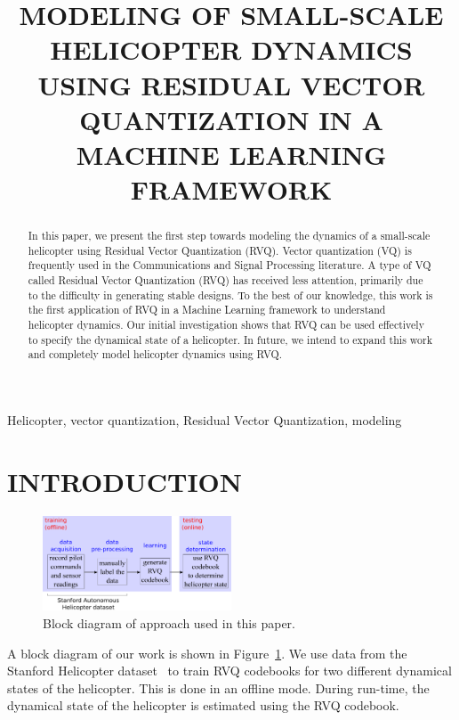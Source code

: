 \documentclass{article}
\title{MODELING OF SMALL-SCALE HELICOPTER DYNAMICS USING RESIDUAL VECTOR QUANTIZATION IN A MACHINE LEARNING FRAMEWORK}
\begin{document}
\ninept
\maketitle
\begin{abstract}
In this paper, we present the first step towards modeling the dynamics of a small-scale helicopter using Residual Vector Quantization (RVQ).  Vector quantization (VQ) is frequently used in the Communications and Signal Processing literature.  A type of VQ called Residual Vector Quantization (RVQ) has received less attention, primarily due to the difficulty in generating stable designs.  To the best of our knowledge, this work is the first application of RVQ in a Machine Learning framework to understand helicopter dynamics.  Our initial investigation shows that RVQ can be used effectively to specify the dynamical state of a helicopter.  In future, we intend to expand this work and completely model helicopter dynamics using RVQ.
\end{abstract}

\begin{keywords}
Helicopter, vector quantization, Residual Vector Quantization, modeling
\end{keywords}

\section{INTRODUCTION}
\begin{figure}[h]
\centering	
\includegraphics[width=0.5\textwidth]{figs/papers_ICAI2013_blockDiagram.pdf}
\caption{Block diagram of approach used in this paper.} 
\label{fig:blockDiagram}				
\end{figure}

A block diagram of our work is shown in Figure~\ref{fig:blockDiagram}.  We use data from the Stanford Helicopter dataset~\cite{dataset_StanfordHelicopter} to train RVQ codebooks for two different dynamical states of the helicopter.  This is done in an offline mode.  During run-time, the dynamical state of the helicopter is estimated using the RVQ codebook.
\end{document}
